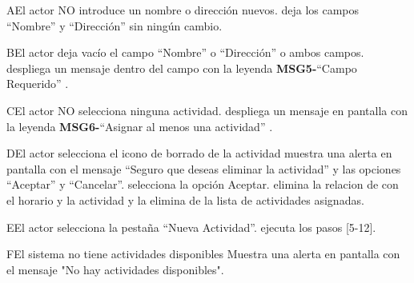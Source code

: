 		\begin{UCtrayectoriaA}{A}{El actor NO introduce un nombre o dirección nuevos.}
			\UCpaso deja los campos “Nombre” y “Dirección” sin ningún cambio.
		\end{UCtrayectoriaA}
		
		\begin{UCtrayectoriaA}{B}{El actor deja vacío el campo “Nombre” o “Dirección” o ambos campos.}
			\UCpaso despliega un mensaje dentro del campo con la leyenda {\bf MSG5-}``Campo Requerido'' .
		\end{UCtrayectoriaA}
		\begin{UCtrayectoriaA}{C}{El actor NO selecciona ninguna actividad.}
			\UCpaso despliega un mensaje en pantalla con la leyenda {\bf MSG6-}``Asignar al menos una actividad'' .
		\end{UCtrayectoriaA}
		\begin{UCtrayectoriaA}{D}{El actor selecciona el icono de borrado de la actividad }
			\UCpaso muestra una alerta en pantalla con el mensaje “Seguro que deseas eliminar la actividad” y las opciones “Aceptar” y “Cancelar”.
		    \UCpaso[\UCactor] selecciona la opción Aceptar.
		    \UCpaso elimina la relacion de con el horario y la actividad y la elimina de la lista de actividades asignadas.
		\end{UCtrayectoriaA}
		\begin{UCtrayectoriaA}{E}{El actor selecciona la pestaña “Nueva Actividad”.}
			\UCpaso ejecuta los pasos [5-12].
		\end{UCtrayectoriaA}
		\begin{UCtrayectoriaA}{F}{El sistema no tiene actividades disponibles}
			\UCpaso Muestra una alerta en pantalla con el mensaje "No hay actividades disponibles".
		\end{UCtrayectoriaA}		


